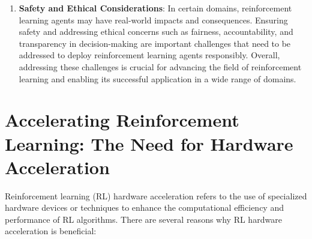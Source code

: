 \begin{enumerate}
	\item \textbf{Safety and Ethical Considerations}: In certain domains, reinforcement learning agents may have real-world impacts and consequences. Ensuring safety and addressing ethical concerns such as fairness, accountability, and transparency in decision-making are important challenges that need to be addressed to deploy reinforcement learning agents responsibly.
	Overall, addressing these challenges is crucial for advancing the field of reinforcement learning and enabling its successful application in a wide range of domains.
\end{enumerate}
\section{Accelerating Reinforcement Learning: The Need for Hardware Acceleration}
Reinforcement learning (RL) hardware acceleration refers to the use of specialized hardware devices or techniques to enhance the computational efficiency and performance of RL algorithms. There are several reasons why RL hardware acceleration is beneficial:
